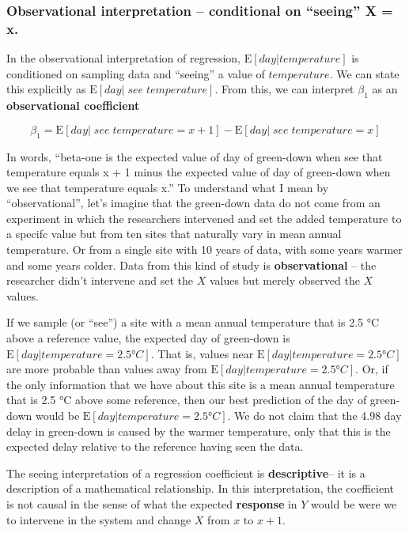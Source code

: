 \documentclass[]{book}
\begin{document}
\hypertarget{observational-interpretation-conditional-on-seeing-x-x.}{%
\subsubsection{Observational interpretation -- conditional on ``seeing'' X = x.}\label{observational-interpretation-conditional-on-seeing-x-x.}}

In the observational interpretation of regression, \(\textrm{E}[day|temperature]\) is conditioned on sampling data and ``seeing'' a value of \(temperature\). We can state this explicitly as \(\textrm{E}[day|\;see\;temperature]\). From this, we can interpret \(\beta_1\) as an \textbf{observational coefficient}

\begin{equation}
\beta_1 = \textrm{E}[day|\;see\;temperature = x+1] - \textrm{E}[day|\;see \;temperature = x]
\end{equation}

In words, ``beta-one is the expected value of day of green-down when see that temperature equals x + 1 minus the expected value of day of green-down when we see that temperature equals x.'' To understand what I mean by ``observational'', let's imagine that the green-down data do not come from an experiment in which the researchers intervened and set the added temperature to a specifc value but from ten sites that naturally vary in mean annual temperature. Or from a single site with 10 years of data, with some years warmer and some years colder. Data from this kind of study is \textbf{observational} -- the researcher didn't intervene and set the \(X\) values but merely observed the \(X\) values.

If we sample (or ``see'') a site with a mean annual temperature that is 2.5 °C above a reference value, the expected day of green-down is \(\textrm{E}[day|temperature = 2.5 °C]\). That is, values near \(\textrm{E}[day|temperature = 2.5 °C]\) are more probable than values away from \(\textrm{E}[day|temperature = 2.5 °C]\). Or, if the only information that we have about this site is a mean annual temperature that is 2.5 °C above some reference, then our best prediction of the day of green-down would be \(\textrm{E}[day|temperature = 2.5 °C]\). We do not claim that the 4.98 day delay in green-down is caused by the warmer temperature, only that this is the expected delay relative to the reference having seen the data.

The seeing interpretation of a regression coefficient is \textbf{descriptive}-- it is a description of a mathematical relationship. In this interpretation, the coefficient is not causal in the sense of what the expected \textbf{response} in \(Y\) would be were we to intervene in the system and change \(X\) from \(x\) to \(x+1\).
\end{document}

